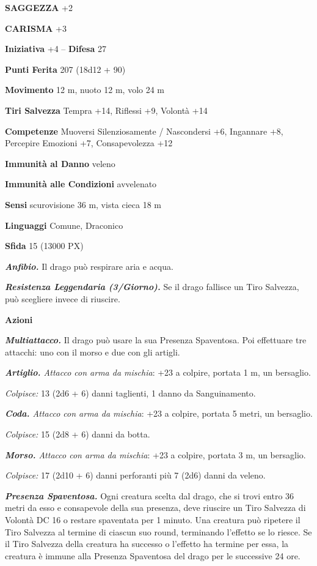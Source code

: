 \begin{multicols}{2}
\textbf{SAGGEZZA} +2

\textbf{CARISMA} +3

\textbf{Iniziativa} +4 -- \textbf{Difesa} 27

\textbf{Punti Ferita} 207 (18d12 + 90)

\textbf{Movimento} 12 m, nuoto 12 m, volo 24 m

\textbf{Tiri Salvezza} Tempra +14, Riflessi +9, Volontà +14

\textbf{Competenze} Muoversi Silenziosamente / Nascondersi +6, Ingannare +8, Percepire Emozioni +7, Consapevolezza +12

\textbf{Immunità al Danno} veleno

\textbf{Immunità alle Condizioni} avvelenato

\textbf{Sensi} scurovisione 36 m, vista cieca 18 m

\textbf{Linguaggi} Comune, Draconico

\textbf{Sfida} 15 (13000 PX)

\textit{\textbf{Anfibio.}} Il drago può respirare aria e acqua.

\textit{\textbf{Resistenza Leggendaria (3/Giorno).}} Se il drago fallisce un Tiro Salvezza, può scegliere invece di riuscire.

\textbf{Azioni}

\textit{\textbf{Multiattacco.}} Il drago può usare la sua Presenza Spaventosa. Poi effettuare tre attacchi: uno con il morso e due con gli artigli.

\textit{\textbf{Artiglio.} Attacco con arma da mischia}: +23 a colpire, portata 1 m, un bersaglio.

\textit{Colpisce:} 13 (2d6 + 6) danni taglienti, 1 danno da Sanguinamento.

\textit{\textbf{Coda.} Attacco con arma da mischia}: +23 a colpire, portata 5 metri, un bersaglio.

\textit{Colpisce:} 15 (2d8 + 6) danni da botta.

\textit{\textbf{Morso.} Attacco con arma da mischia}: +23 a colpire, portata 3 m, un bersaglio.

\textit{Colpisce:} 17 (2d10 + 6) danni perforanti più 7 (2d6) danni da veleno.

\textit{\textbf{Presenza Spaventosa.}} Ogni creatura scelta dal drago, che si trovi entro 36 metri da esso e consapevole della sua presenza, deve riuscire un Tiro Salvezza di Volontà DC 16 o restare spaventata per 1 minuto. Una creatura può ripetere il Tiro Salvezza al termine di ciascun suo round, terminando l'effetto se lo riesce. Se il Tiro Salvezza della creatura ha successo o l'effetto ha termine per essa, la creatura è immune alla Presenza Spaventosa del drago per le successive 24 ore.


\end{multicols}
